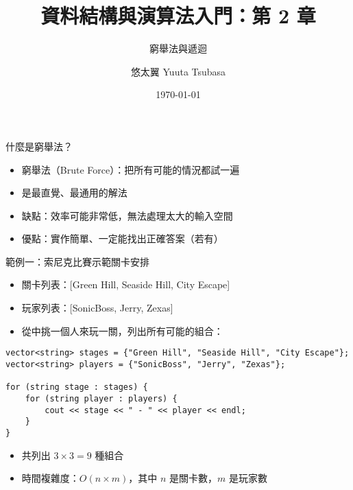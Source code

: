 \documentclass{beamer}
\title{資料結構與演算法入門：第 2 章}
\subtitle{窮舉法與遞迴}
\author{悠太翼 Yuuta Tsubasa}
\date{\today}
\begin{document}
\frame{\titlepage}

\begin{frame}{什麼是窮舉法？}
\begin{itemize}
    \item 窮舉法（Brute Force）：把所有可能的情況都試一遍
    \item 是最直覺、最通用的解法
    \item 缺點：效率可能非常低，無法處理太大的輸入空間
    \item 優點：實作簡單、一定能找出正確答案（若有）
\end{itemize}
\end{frame}

\begin{frame}{範例一：索尼克比賽示範關卡安排}
\begin{itemize}
    \item 關卡列表：[Green Hill, Seaside Hill, City Escape]
    \item 玩家列表：[SonicBoss, Jerry, Zexas]
    \item 從中挑一個人來玩一關，列出所有可能的組合：
\end{itemize}

\begin{lstlisting}[style=cppstyle]
vector<string> stages = {"Green Hill", "Seaside Hill", "City Escape"};
vector<string> players = {"SonicBoss", "Jerry", "Zexas"};

for (string stage : stages) {
    for (string player : players) {
        cout << stage << " - " << player << endl;
    }
}
\end{lstlisting}

\begin{itemize}
    \item 共列出 $3 \times 3 = 9$ 種組合
    \item 時間複雜度：$O(n \times m)$，其中 $n$ 是關卡數，$m$ 是玩家數
\end{itemize}
\end{frame}
\end{document}
